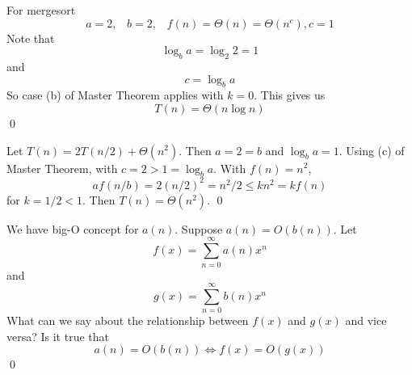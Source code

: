 \begin{eg}
  For mergesort
  \[
  a = 2, \,\,\,\,\, b = 2, \,\,\,\,\, f(n) = \Theta(n) = \Theta(n^c), c = 1
  \]
  Note that
  \[
  \log_b a = \log_2 2 = 1
  \]
  and
  \[
  c = \log_b a
  \]
  So case (b) of Master Theorem applies with $k = 0$.
  This gives us
  \[
  T(n) = \Theta(n \log n)
  \]
  \qed
\end{eg}

\begin{eg}
  Let $T(n) = 2T(n/2) + \Theta(n^2)$.
  Then $a = 2 = b$ and $\log_b a = 1$.
  Using (c) of Master Theorem, with $c = 2 > 1 = \log_b a$.
  With $f(n) = n^2$,
  \[
  af(n/b) = 2 (n/2)^2 = n^2/2 \leq k n^2 = kf(n)
  \]
  for $k = 1/2 < 1$.
  Then $T(n) = \Theta(n^2)$.
  \qed
\end{eg}





\begin{ex}
We have big-O concept for $a(n)$.
Suppose $a(n) = O(b(n))$.
Let
\[
f(x) = \sum_{n = 0}^\infty a(n) x^n
\]
and
\[
g(x) = \sum_{n = 0}^\infty b(n) x^n
\]
What can we say about the relationship between $f(x)$ and $g(x)$ and
vice versa?
Is it true that
\[
a(n) = O(b(n)) \iff f(x) = O(g(x))
\]
\qed
\end{ex}

